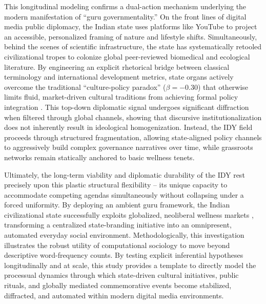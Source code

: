 \documentclass[11pt]{article}
\begin{document}
This longitudinal modeling confirms a dual-action mechanism underlying the modern manifestation of ``guru governmentality.'' On the front lines of digital media public diplomacy, the Indian state uses platforms like YouTube to project an accessible, personalized framing of nature and lifestyle shifts. Simultaneously, behind the scenes of scientific infrastructure, the state has systematically retooled civilizational tropes to colonize global peer-reviewed biomedical and ecological literature. By engineering an explicit rhetorical bridge between classical terminology and international development metrics, state organs actively overcome the traditional ``culture-policy paradox'' ($\beta = -0.30$) that otherwise limits fluid, market-driven cultural traditions from achieving formal policy integration \cite{zhou2026yoga}. This top-down diplomatic signal undergoes significant diffraction when filtered through global channels, showing that discursive institutionalization does not inherently result in ideological homogenization. Instead, the IDY field proceeds through structured fragmentation, allowing state-aligned policy channels to aggressively build complex governance narratives over time, while grassroots networks remain statically anchored to basic wellness tenets.

Ultimately, the long-term viability and diplomatic durability of the IDY rest precisely upon this plastic structural flexibility -- its unique capacity to accommodate competing agendas simultaneously without collapsing under a forced uniformity. By deploying an ambient guru framework, the Indian civilizational state successfully exploits globalized, neoliberal wellness markets \cite{sen2026yoga}, transforming a centralized state-branding initiative into an omnipresent, automated everyday social environment. Methodologically, this investigation illustrates the robust utility of computational sociology to move beyond descriptive word-frequency counts. By testing explicit inferential hypotheses longitudinally and at scale, this study provides a template to directly model the processual dynamics through which state-driven cultural initiatives, public rituals, and globally mediated commemorative events become stabilized, diffracted, and automated within modern digital media environments.


\clearpage





\newpage
\end{document}
